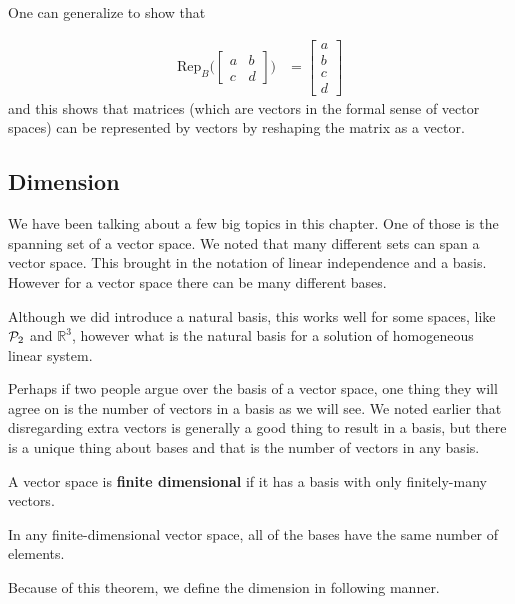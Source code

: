One can generalize to show that

\begin{align*}
\text{Rep}_B \biggl( \begin{bmatrix}
a & b \\ c & d 
\end{bmatrix} \biggr) & = \begin{bmatrix}
a \\ b \\ c \\ d
\end{bmatrix}
\end{align*} 
%
and this shows that matrices (which are vectors in the formal sense of vector spaces) can be represented by vectors by reshaping the matrix as a vector.  

\subsection{Dimension}

We have been talking about a few big topics in this chapter.  One of those is the spanning set of a vector space.  We noted that many different sets can span a vector space.  This brought in the notation of linear independence and a basis.  However for a vector space there can be many different bases.  

Although we did introduce a natural basis, this works well for some spaces, like ${\cal P}_2$ and $\mathbb{R}^3$, however what is the natural basis for a solution of homogeneous linear system.  

Perhaps if two people argue over the basis of a vector space, one thing they will agree on is the number of vectors in a basis as we will see.  We noted earlier that disregarding extra vectors is generally a good thing to result in a basis, but there is a unique thing about bases and that is the number of vectors in any basis.  

\begin{definition}
A vector space is \textbf{finite dimensional} if it has a basis with only finitely-many vectors.  
\end{definition}

\begin{theorem}
In any finite-dimensional vector space, all of the bases have the same number of elements.  
\end{theorem}

Because of this theorem, we define the dimension in following manner.  

